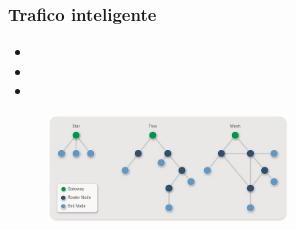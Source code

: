 \documentclass{beamer}
\begin{document}
\begin{frame}
\frametitle{Trafico inteligente}
\begin{itemize}
\item 
\item 
\item 
\end{itemize}
\begin{figure}[!h]
\centering
\includegraphics[width=2.5in]{topologias}
\end{figure}
\end{frame}
\end{document}
